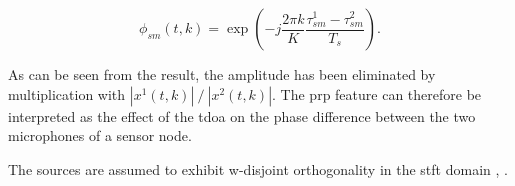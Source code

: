 \begin{equation}
    \phi_{sm}(t,k)=\exp{\left ( -j\frac{2\pi k}{K}\frac{\tau_{sm}^1-\tau_{sm}^2}{T_s}\right )}.
\end{equation}

As can be seen from the result, the amplitude has been eliminated by multiplication with $|x^1(t,k)|\ /\ |x^2(t,k)|$. The \gls{prp} feature can therefore be interpreted as the effect of the \gls{tdoa} on the phase difference between the two microphones of a sensor node.

The sources are assumed to exhibit w-disjoint orthogonality in the \gls{stft} domain \cite[p. 393]{Schwartz2014}, \cite{Rickard2006}.